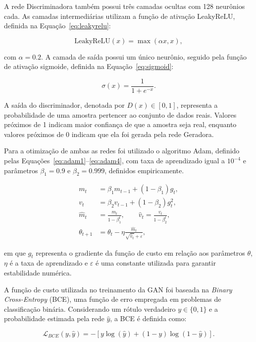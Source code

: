 \documentclass[10pt,a4paper]{article}
\begin{document}
A rede Discriminadora também possui três camadas ocultas com 128 neurônios cada. As camadas intermediárias utilizam a função de ativação LeakyReLU, definida na Equação~\ref{eq:leakyrelu}:

\begin{equation}
\text{LeakyReLU}(x)=\max(\alpha x,x),
\label{eq:leakyrelu}
\end{equation}

com $\alpha = 0.2$. A camada de saída possui um único neurônio, seguido pela função de ativação sigmoide, definida na Equação~\ref{eq:sigmoid}:

\begin{equation}
\sigma(x)=\frac{1}{1+e^{-x}}.
\label{eq:sigmoid}
\end{equation}

A saída do discriminador, denotada por $D(x)\in[0,1]$, representa a probabilidade de uma amostra pertencer ao conjunto de dados reais. Valores próximos de 1 indicam maior confiança de que a amostra seja real, enquanto valores próximos de 0 indicam que ela foi gerada pela rede Geradora.

Para a otimização de ambas as redes foi utilizado o algoritmo Adam, definido pelas Equações~\ref{eq:adam1}--\ref{eq:adam4}, com taxa de aprendizado igual a $10^{-4}$ e parâmetros $\beta_1 = 0.9$ e $\beta_2 = 0.999$, definidos empiricamente.

\begin{align}
m_t &= \beta_1 m_{t-1} + (1-\beta_1)g_t,
\label{eq:adam1}\\
v_t &= \beta_2 v_{t-1} + (1-\beta_2)g_t^2,
\label{eq:adam2}\\
\hat{m}_t &= \frac{m_t}{1-\beta_1^t}, \qquad
\hat{v}_t = \frac{v_t}{1-\beta_2^t},
\label{eq:adam3}\\
\theta_{t+1} &= \theta_t - \eta\frac{\hat{m}_t}{\sqrt{\hat{v}_t}+\varepsilon},
\label{eq:adam4}
\end{align}

em que $g_t$ representa o gradiente da função de custo em relação aos parâmetros $\theta$, $\eta$ é a taxa de aprendizado e $\varepsilon$ é uma constante utilizada para garantir estabilidade numérica.

A função de custo utilizada no treinamento da GAN foi baseada na
\textit{Binary Cross-Entropy} (BCE), uma função de erro empregada em
problemas de classificação binária. Considerando um rótulo verdadeiro
$y \in \{0,1\}$ e a probabilidade estimada pela rede $\hat{y}$, a BCE é
definida como:

\begin{equation}
\mathcal{L}_{BCE}(y,\hat{y})
=
-\left[
y\log(\hat{y})
+
(1-y)\log(1-\hat{y})
\right].
\label{eq:bce}
\end{equation}
\end{document}
